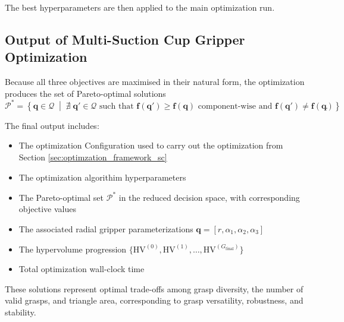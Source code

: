 The best hyperparameters are then applied to the main optimization run.

\subsection{Output of Multi-Suction Cup Gripper Optimization}

Because all three objectives are maximised in their natural form, the optimization produces the set
of Pareto-optimal solutions
\begin{equation}
    \mathcal{P}^*
    =
    \left\{
        \mathbf{q} \in \mathcal{Q}
        \;\middle|\;
        \nexists\; \mathbf{q}' \in \mathcal{Q}
        \text{ such that }
        \mathbf{f}(\mathbf{q}') \geq \mathbf{f}(\mathbf{q})
        \text{ component-wise and }
        \mathbf{f}(\mathbf{q}') \neq \mathbf{f}(\mathbf{q})
    \right\}.
\end{equation}

The final output includes:
\begin{itemize}
    \item The optimization Configuration used to carry out the optimization from Section \ref{sec:optimzation_framework_sc}
    \item The optimization algorithim hyperparameters 
    \item The Pareto-optimal set $\mathcal{P}^*$ in the reduced decision space, with corresponding
    objective values
    \item The associated radial gripper parameterizations $\mathbf{q} =
    [r,\alpha_1,\alpha_2,\alpha_3]$
    \item The hypervolume progression
    $\{\mathrm{HV}^{(0)},\mathrm{HV}^{(1)},\dots,\mathrm{HV}^{(G_{\mathrm{final}})}\}$
    \item Total optimization wall-clock time
\end{itemize}


These solutions represent optimal trade-offs among grasp diversity, the number of valid grasps, and
triangle area, corresponding to grasp versatility, robustness, and stability.